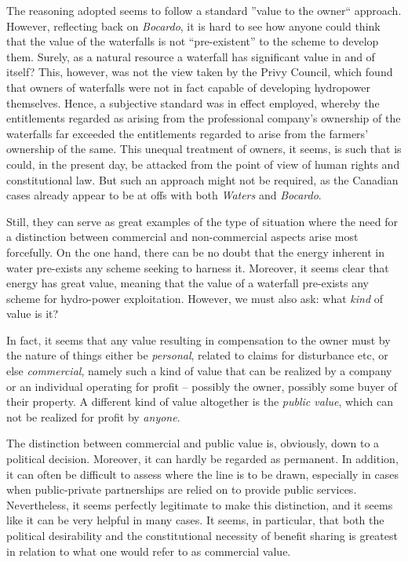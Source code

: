 The reasoning adopted seems to follow a standard ''value to the owner`` approach. However, reflecting back on {\it Bocardo}, it is hard to see how anyone could think that the value of the waterfalls is not ``pre-existent'' to the scheme to develop them. Surely, as a natural resource a waterfall has significant value in and of itself? This, however, was not the view taken by the Privy Council, which found that owners of waterfalls were not in fact capable of developing hydropower themselves. Hence, a subjective standard was in effect employed, whereby the entitlements regarded as arising from the professional company's  ownership of the waterfalls far exceeded the entitlements regarded to arise from the farmers' ownership of the same. This unequal treatment of owners, it seems, is such that is could, in the present day, be attacked from the point of view of human rights and constitutional law. But such an approach might not be required, as the Canadian cases already appear to be at offs with both {\it Waters} and {\it Bocardo}.

Still, they can serve as great examples of the type of situation where the need for a distinction between commercial and non-commercial aspects arise most forcefully. On the one hand, there can be no doubt that the energy inherent in water pre-exists any scheme seeking to harness it. Moreover, it seems clear that energy has great value, meaning that the value of a waterfall pre-exists any scheme for hydro-power exploitation. However, we must also ask: what \emph{kind} of value is it?

In fact, it seems that any value resulting in compensation to the owner must by the nature of things either be \emph{personal}, related to claims for disturbance etc, or else \emph{commercial}, namely such a kind of value that can be realized by a company or an individual operating for profit -- possibly the owner, possibly some buyer of their property. A different kind of value altogether is the \emph{public value}, which can not be realized for profit by \emph{anyone}. 

The distinction between commercial and public value is, obviously, down to a political decision. Moreover, it can hardly be regarded as permanent. In addition, it can often be difficult to assess where the line is to be drawn, especially in cases when public-private partnerships are relied on to provide public services. Nevertheless, it seems perfectly legitimate to make this distinction, and it seems like it can be very helpful in many cases. It seems, in particular, that both the political desirability and the constitutional necessity of benefit sharing is greatest in relation to what one would refer to as commercial value. 

